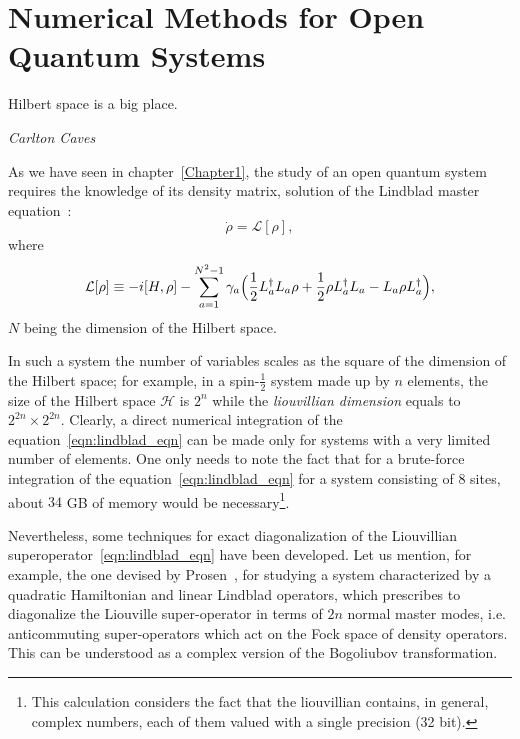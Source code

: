 \chapter{Numerical Methods for Open Quantum Systems}
\label{chapter3}
\epigraph{Hilbert space is a big place.}{\textit{Carlton Caves}}
As we have seen in chapter~\ref{Chapter1}, the study of an open quantum system requires the knowledge of its density matrix, solution of the Lindblad master equation~\cite{presk:quant_info}:
\begin{equation*}
    \dot{\rho} = \mathcal{L}[\rho],
\end{equation*}
where
\begin{equation}
\label{eqn:lindblad_eqn}
    \mathcal{L}[\rho] \equiv -i[H, \rho] - \sum_{a=1}^{N^2-1}\gamma_a\Bigl(\frac{1}{2}L_a^{\dagger}L_a\rho + \frac{1}{2}\rho L_a^{\dagger}L_a - L_a\rho L_a^{\dagger}\Bigl),
\end{equation}
$N$ being the dimension of the Hilbert space.

In such a system the number of variables scales as the square of the dimension of the Hilbert space; for example, in a spin-$\frac{1}{2}$ system made up by $n$ elements, the size of the Hilbert space $\mathcal{H}$ is $2^n$ while the \emph{liouvillian dimension} equals to $2^{2n} \times 2^{2n}$. Clearly, a direct numerical integration of the equation~\ref{eqn:lindblad_eqn} can be made only for systems with a very limited number of elements. One only needs to note the fact that for a brute-force integration of the equation~\ref{eqn:lindblad_eqn} for a system consisting of $8$ sites, about $34$ GB of memory would be necessary\footnote{This calculation considers the fact that the liouvillian contains, in general, complex numbers, each of them valued with a single precision (32 bit).}.

Nevertheless, some techniques for exact diagonalization of the Liouvillian superoperator~\ref{eqn:lindblad_eqn} have been developed. Let us mention, for example, the one devised by Prosen~\cite{Prosen_2008}, for studying a system characterized by a quadratic Hamiltonian and linear Lindblad operators, which prescribes to diagonalize the Liouville super-operator in terms of $2n$ normal master modes, i.e. anticommuting super-operators which act on the Fock space of density operators. This can be understood as a complex version of the Bogoliubov transformation.


